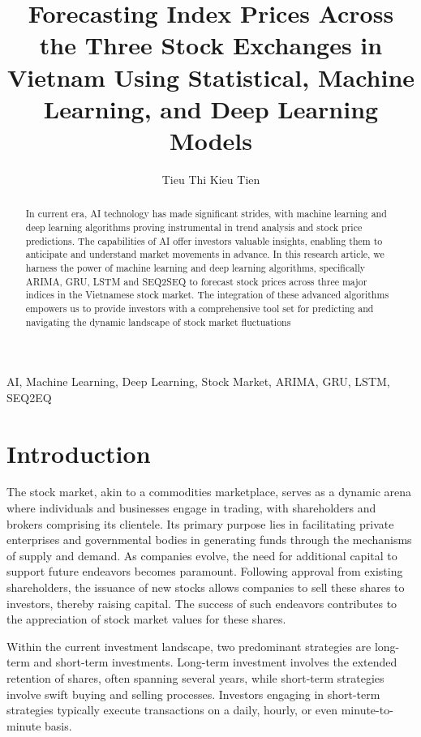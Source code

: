 \documentclass{ieeeojies}
\begin{document}
\title{Forecasting Index Prices Across the Three Stock Exchanges in Vietnam Using Statistical, Machine Learning, and Deep Learning Models}
\author{Tieu Thi Kieu Tien}

\begin{abstract}
In current era, AI technology has made significant strides, with machine learning and deep learning algorithms proving instrumental in trend analysis and stock price predictions. The capabilities of AI offer investors valuable insights, enabling them to anticipate and understand market movements in advance. In this research article, we harness the power of machine learning and deep learning algorithms, specifically ARIMA, GRU, LSTM and SEQ2SEQ to forecast stock prices across three major indices in the Vietnamese stock market. The integration of these advanced algorithms empowers us to provide investors with a comprehensive tool set for predicting and navigating the dynamic landscape of stock market fluctuations
\end{abstract}

\begin{keywords}
{AI, Machine Learning, Deep Learning, Stock Market, ARIMA, GRU, LSTM, SEQ2EQ}
\end{keywords}

\titlepgskip=-15pt

\maketitle
\section{Introduction}
\label{sec:introduction}
The stock market, akin to a commodities marketplace, serves as a dynamic arena where individuals and businesses engage in trading, with shareholders and brokers comprising its clientele. Its primary purpose lies in facilitating private enterprises and governmental bodies in generating funds through the mechanisms of supply and demand. As companies evolve, the need for additional capital to support future endeavors becomes paramount. Following approval from existing shareholders, the issuance of new stocks allows companies to sell these shares to investors, thereby raising capital. The success of such endeavors contributes to the appreciation of stock market values for these shares.

Within the current investment landscape, two predominant strategies are long-term and short-term investments. Long-term investment involves the extended retention of shares, often spanning several years, while short-term strategies involve swift buying and selling processes. Investors engaging in short-term strategies typically execute transactions on a daily, hourly, or even minute-to-minute basis.
\end{document}

